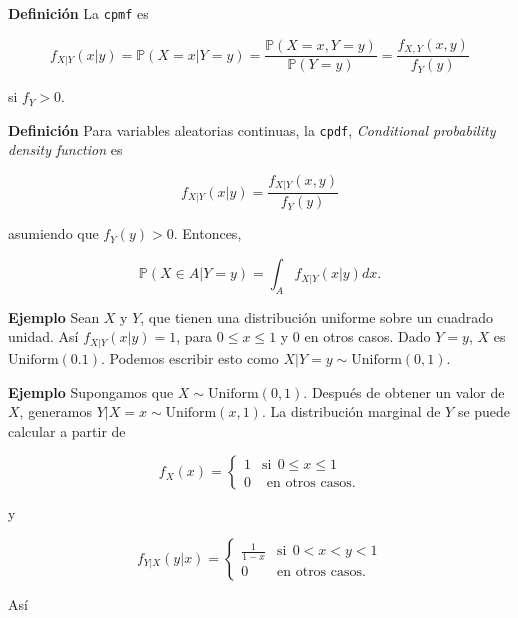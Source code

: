 \documentclass{article}\usepackage[]{graphicx}\usepackage[]{color}
\begin{document}
\vspace{0.4cm}

\textbf{Definici\'on} La \texttt{cpmf} es

\[
f_{X|Y}(x|y) = \mathbb{P}(X = x| Y=y) = \frac{\mathbb{P}(X = x, Y=y)}{\mathbb{P}(Y = y)} = \frac{f_{X,Y}(x,y)}{f_{Y}(y)}
\]

\vspace{0.2cm}

si $f_{Y} > 0$.

\vspace{0.2cm}

\textbf{Definici\'on} Para variables aleatorias continuas, la \texttt{cpdf}, \textit{Conditional probability density function} es

\[
f_{X|Y}(x|y) = \frac{f_{X|Y}(x,y)}{f_{Y}(y)}
\]

\vspace{0.3cm}

asumiendo que $f_{Y}(y) > 0$. Entonces,

\[
\mathbb{P}(X \in A| Y=y) = \int_{A}f_{X|Y}(x|y)dx.
\]

\vspace{0.5cm}

\textbf{Ejemplo} Sean $X$ y $Y$, que tienen una distribuci\'on uniforme sobre un cuadrado unidad. As\'i $f_{X|Y}(x|y) = 1$, para $0 \leq x \leq 1$ y $0$ en otros casos. Dado $Y =y$, $X$ es $\mbox{Uniform}(0.1)$. Podemos escribir esto como $X|Y = y \sim \mbox{Uniform}(0,1)$.

\vspace{0.5cm}

\textbf{Ejemplo} Supongamos que $X \sim \mbox{Uniform}(0,1)$. Despu\'es de obtener un valor de $X$, generamos $Y|X = x \sim \mbox{Uniform}(x,1)$. La distribuci\'on marginal de $Y$ se puede calcular a partir de

\[
f_{X}(x) = \begin{cases}
1 & \mbox{si}\ \ 0 \leq x \leq 1\\
0 & \mbox{ en otros casos}.
\end{cases}
\]

y 

\[
f_{Y|X}(y|x) = \begin{cases}
\frac{1}{1 -x}& \mbox{si}\ \ 0 < x < y < 1 \\
0 & \mbox{en otros casos}.
\end{cases}
\]

\vspace{0.3cm}

As\'i
\end{document}
